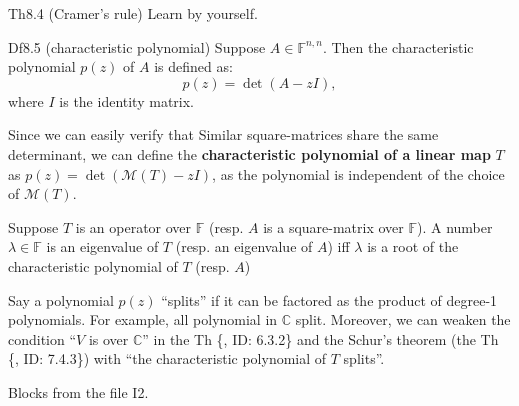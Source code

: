 \documentclass{article}
\begin{document}
\begin{Th}{Th8.4 (Cramer's rule)}
    Learn by yourself.
\end{Th}

\begin{Df}{Df8.5 (characteristic polynomial)}
    Suppose $A\in\mathbb{F}^{n,n}$. Then the characteristic polynomial $p(z)$ of $A$ is defined as:
    $$ p(z) = \det (A-zI), $$
    where $I$ is the identity matrix.
\end{Df}

\begin{Rmk}{}
    \begin{compactenum}
        \item Since we can easily verify that \textcolor{Th}{Similar square-matrices share the same determinant}, \textcolor{Df}{we can define the \textbf{characteristic polynomial of a linear map} $T$ as $p(z) = \det (\mathcal{M}(T)-zI)$}, as the polynomial is independent of the choice of $\mathcal{M}(T)$.
        \item \textcolor{Th}{Suppose $T$ is an operator over $\mathbb{F}$ (resp. $A$ is a square-matrix over $\mathbb{F}$). A number $\lambda\in\mathbb{F}$ is an eigenvalue of $T$ (resp. an eigenvalue of $A$) iff $\lambda$ is a root of the characteristic polynomial of $T$ (resp. $A$)}
        \item \textcolor{Df}{Say a polynomial $p(z)$ ``splits'' if it can be factored as the product of degree-1 polynomials.} For example, \textcolor{Th}{all polynomial in $\mathbb{C}$ split.} Moreover, \textcolor{Th}{we can weaken the condition ``$V$ is over $\mathbb{C}$'' in the Th \{, ID: 6.3.2\} and the Schur's theorem (the Th \{, ID: 7.4.3\}) with ``the characteristic polynomial of $T$ splits''.}
    \end{compactenum}
\end{Rmk}

\begin{Th}{Blocks from the file I2.}
\end{Th}
\end{document}
